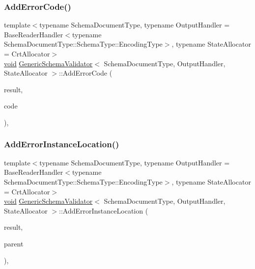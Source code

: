 \subsubsection{\texorpdfstring{Add\+Error\+Code()}{AddErrorCode()}}
{\footnotesize\ttfamily template$<$typename Schema\+Document\+Type, typename Output\+Handler = Base\+Reader\+Handler$<$typename Schema\+Document\+Type\+::\+Schema\+Type\+::\+Encoding\+Type$>$, typename State\+Allocator = Crt\+Allocator$>$ \\
\hyperlink{imgui__impl__opengl3__loader_8h_ac668e7cffd9e2e9cfee428b9b2f34fa7}{void} \hyperlink{classGenericSchemaValidator}{Generic\+Schema\+Validator}$<$ Schema\+Document\+Type, Output\+Handler, State\+Allocator $>$\+::Add\+Error\+Code (\begin{DoxyParamCaption}\item[{\hyperlink{classGenericSchemaValidator_a435890a2dddeecb896d4ac76de03ca68}{Value\+Type} \&}]{result,  }\item[{const \hyperlink{group__RAPIDJSON__ERRORS_ga2e1f88f94a5d9a6817a5de0ed2f0105a}{Validate\+Error\+Code}}]{code }\end{DoxyParamCaption})\hspace{0.3cm}{\ttfamily [inline]}, {\ttfamily [private]}}

\mbox{\label{classGenericSchemaValidator_adabc1745041f939572aae7e2e6477f8e}} 
\subsubsection{\texorpdfstring{Add\+Error\+Instance\+Location()}{AddErrorInstanceLocation()}}
{\footnotesize\ttfamily template$<$typename Schema\+Document\+Type, typename Output\+Handler = Base\+Reader\+Handler$<$typename Schema\+Document\+Type\+::\+Schema\+Type\+::\+Encoding\+Type$>$, typename State\+Allocator = Crt\+Allocator$>$ \\
\hyperlink{imgui__impl__opengl3__loader_8h_ac668e7cffd9e2e9cfee428b9b2f34fa7}{void} \hyperlink{classGenericSchemaValidator}{Generic\+Schema\+Validator}$<$ Schema\+Document\+Type, Output\+Handler, State\+Allocator $>$\+::Add\+Error\+Instance\+Location (\begin{DoxyParamCaption}\item[{\hyperlink{classGenericSchemaValidator_a435890a2dddeecb896d4ac76de03ca68}{Value\+Type} \&}]{result,  }\item[{bool}]{parent }\end{DoxyParamCaption})\hspace{0.3cm}{\ttfamily [inline]}, {\ttfamily [private]}}

